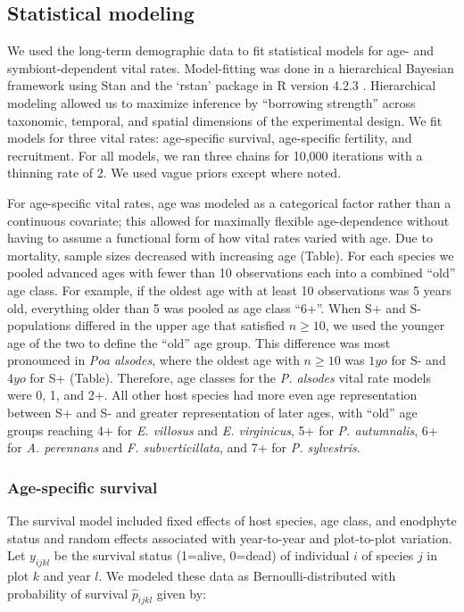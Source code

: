 \documentclass[11pt]{article}
\begin{document}
\subsection*{Statistical modeling}
We used the long-term demographic data to fit statistical models for age- and symbiont-dependent vital rates. 
Model-fitting was done in a hierarchical Bayesian framework using Stan \citep{carpenter2017stan} and the `rstan' package \citep{rstan} in R version 4.2.3 \citep{R}. 
Hierarchical modeling allowed us to maximize inference by ``borrowing strength'' across taxonomic, temporal, and spatial dimensions of the experimental design. 
We fit models for three vital rates: age-specific survival, age-specific fertility, and recruitment. 
For all models, we ran three chains for 10,000 iterations with a thinning rate of 2. 
We used vague priors except where noted. 

For age-specific vital rates, age was modeled as a categorical factor rather than a continuous covariate; this allowed for maximally flexible age-dependence without having to assume a functional form of how vital rates varied with age. 
Due to mortality, sample sizes decreased with increasing age (Table).
For each species we pooled advanced ages with fewer than 10 observations each into a combined ``old'' age class. 
For example, if the oldest age with at least 10 observations was 5 years old, everything older than 5 was pooled as age class ``6+''.
When S+ and S- populations differed in the upper age that satisfied $n \geq 10$, we used the younger age of the two to define the ``old'' age group. 
This difference was most pronounced in \textit{Poa alsodes}, where the oldest age with $n \geq 10$ was $1yo$ for S- and $4yo$ for S+ (Table). 
Therefore, age classes for the \textit{P. alsodes} vital rate models were 0, 1, and 2+. 
All other host species had more even age representation between S+ and S- and greater representation of later ages, with ``old'' age groups reaching 4+ for \textit{E. villosus} and \textit{E. virginicus}, 5+ for \textit{P. autumnalis}, 6+ for \textit{A. perennans} and \textit{F. subverticillata}, and 7+ for \textit{P. sylvestris}. 

\subsubsection*{Age-specific survival}
The survival model included fixed effects of host species, age class, and enodphyte status and random effects associated with year-to-year and plot-to-plot variation. 
Let $y_{ijkl}$ be the survival status (1=alive, 0=dead) of individual $i$ of species $j$ in plot $k$ and year $l$.  
We modeled these data as Bernoulli-distributed with probability of survival $\hat{p}_{ijkl}$ given by:
\end{document}
